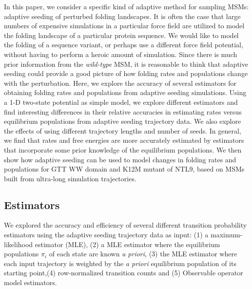 \documentclass[%
 aip,
rsi,%
 amsmath,amssymb,
 reprint,%
]{revtex4-1}
\begin{document}
In this paper, we consider a specific kind of adaptive method for sampling MSMs: adaptive seeding of perturbed folding landscapes.  It is often the case that large numbers of expensive simulations in a particular force field are utilized to model the folding landscape of a particular protein sequence. We would like to model the folding of a sequence variant, or perhaps use a different force field potential, without having to perform a heroic amount of simulation.  Since there is much prior information from the \textit{wild-type} MSM, it is reasonable to think that adaptive seeding could provide a good picture of how folding rates and populations change with the perturbation.  Here, we explore the accuracy of several estimators for obtaining folding rates and populations from adaptive seeding simulations.  
Using a 1-D two-state potential as simple model, we explore different estimators and find interesting differences in their relative accuracies in estimating rates versus equilibrium populations from adaptive seeding trajectory data.  We also explore  the effects of using different trajectory lengths and number of seeds. In general, we find that rates and free energies are more accurately estimated by estimators that incorporate some prior knowledge of the equilibrium populations. We then show how adaptive seeding can be used to model changes in folding rates and populations for GTT WW domain and K12M mutant of NTL9, based on MSMs built from ultra-long simulation trajectories.


\subsection{\label{sec:level2}Estimators}

We explored the accuracy and efficiency of several different transition probability estimators using the adaptive seeding trajectory data as input: (1) a maximum-likelihood estimator (MLE), (2) a MLE estimator where the equilibrium populations $\pi_i$ of each state are known \textit{a priori}, (3) the MLE estimator where each input trajectory is weighted by the \textit{a priori} equilibrium population of its starting point,(4) row-normalized transition counts and (5) Observable operator model estimators.
\end{document}
